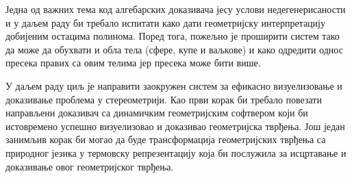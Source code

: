 Једна од важних тема код алгебарских доказивача јесу услови
недегенерисаности и у даљем раду би требало испитати како дати
геометријску интерпретацију добијеним остацима полинома. Поред тога,
пожељно је проширити систем тако да може да обухвати и обла тела
(сфере, купе и ваљкове) и како одредити однос пресека правих са овим
телима јер пресека може бити више.

У даљем раду циљ је направити заокружен систем за ефикасно
визуелизовање и доказивање проблема у стереометрији. Као први корак би
требало повезати направљени доказивач са динамичким геометријским
софтвером који би истовремено успешно визуелизовао и доказивао
геометријска тврђења. Још један занимљив корак би могао да буде
трансформација геометријских тврђења са природног језика у термовску
репрезентацију која би послужила за исцртавање и доказивање овог
геометријског тврђења.

